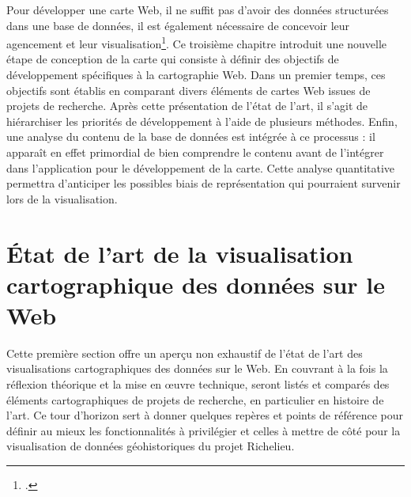 Pour développer une carte Web, il ne suffit pas d'avoir des données structurées dans une base de données, il est également nécessaire de concevoir leur agencement et leur visualisation\footcite{LAGNELManuel2021, ANDRYChapitre2022, CEJUDObreve2022}. Ce troisième chapitre introduit une nouvelle étape de conception de la carte qui consiste à définir des objectifs de développement spécifiques à la cartographie Web. Dans un premier temps, ces objectifs sont établis en comparant divers éléments de cartes Web issues de projets de recherche. Après cette présentation de l'état de l'art, il s'agit de hiérarchiser les priorités de développement à l'aide de plusieurs méthodes. Enfin, une analyse du contenu de la base de données est intégrée à ce processus : il apparaît en effet primordial de bien comprendre le contenu avant de l'intégrer dans l'application pour le développement de la carte. Cette analyse quantitative permettra d'anticiper les possibles biais de représentation qui pourraient survenir lors de la visualisation.

\section{État de l'art de la visualisation cartographique des données sur le Web}\label{section:choix-carto}
Cette première section offre un aperçu non exhaustif de l'état de l'art des visualisations cartographiques des données sur le Web. En couvrant à la fois la réflexion théorique et la mise en œuvre technique, seront listés et comparés des éléments cartographiques de projets de recherche, en particulier en histoire de l'art. Ce tour d'horizon sert à donner quelques repères et points de référence pour définir au mieux les fonctionnalités à privilégier et celles à mettre de côté pour la visualisation de données géohistoriques du projet Richelieu.


